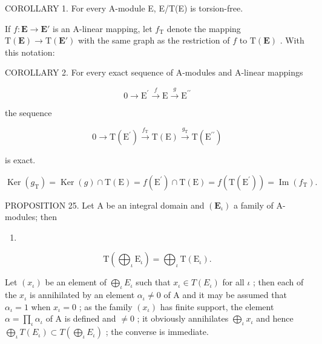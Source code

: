 COROLLARY 1. For every A-module E, E/T(E) is torsion-free.

If \(f: \mathbf{E} \to \mathbf{E}'\) is an A-linear mapping, let \(f_{\mathrm{T}}\) denote the mapping \(\mathrm{T}(\mathbf{E}) \to \mathrm{T}(\mathbf{E}')\) with the same graph as the restriction of \(f\) to \(\mathrm{T}(\mathbf{E})\) . With this notation:

COROLLARY 2. For every exact sequence of A-modules and A-linear mappings

\[
0 \longrightarrow \mathrm{E} ^ {\prime} \stackrel {f} {\longrightarrow} \mathrm{E} \stackrel {g} {\longrightarrow} \mathrm{E} ^ {\prime \prime}
\]

the sequence

\[
0 \longrightarrow \mathrm{T} (\mathrm{E} ^ {\prime}) \xrightarrow {f _ {\mathrm{T}}} \mathrm{T} (\mathrm{E}) \xrightarrow {g _ {\mathrm{T}}} \mathrm{T} (\mathrm{E} ^ {\prime \prime})
\]

is exact.

\[
\operatorname{Ker} \left(g _ {\mathrm{T}}\right) = \operatorname{Ker} (g) \cap \mathrm{T} (\mathrm{E}) = f \left(\mathrm{E} ^ {\prime}\right) \cap \mathrm{T} (\mathrm{E}) = f \left(\mathrm{T} \left(\mathrm{E} ^ {\prime}\right)\right) = \operatorname{Im} \left(f _ {\mathrm{T}}\right).
\]

PROPOSITION 25. Let A be an integral domain and \((\mathbf{E}_{\iota})\) a family of A-modules; then

\begin{enumerate}
\def\labelenumi{(\arabic{enumi})}
\setcounter{enumi}{36}
\tightlist
\item
\end{enumerate}

\[
\mathrm{T} \left(\bigoplus_ {\iota} \mathrm{E} _ {\iota}\right) = \bigoplus_ {\iota} \mathrm{T} (\mathrm{E} _ {\iota}).
\]

Let \((x_{\iota})\) be an element of \(\bigoplus_{\iota} E_{\iota}\) such that \(x_{\iota} \in T(E_{\iota})\) for all \(\iota\) ; then each of the \(x_{\iota}\) is annihilated by an element \(\alpha_{\iota} \neq 0\) of A and it may be assumed that \(\alpha_{\iota} = 1\) when \(x_{\iota} = 0\) ; as the family \((x_{\iota})\) has finite support, the element \(\alpha = \prod_{\iota} \alpha_{\iota}\) of A is defined and \(\neq 0\) ; it obviously annihilates \(\bigoplus_{\iota} x_{\iota}\) and hence \(\bigoplus_{\iota} T(E_{\iota}) \subset T\left(\bigoplus_{\iota} E_{\iota}\right)\) ; the converse is immediate.

